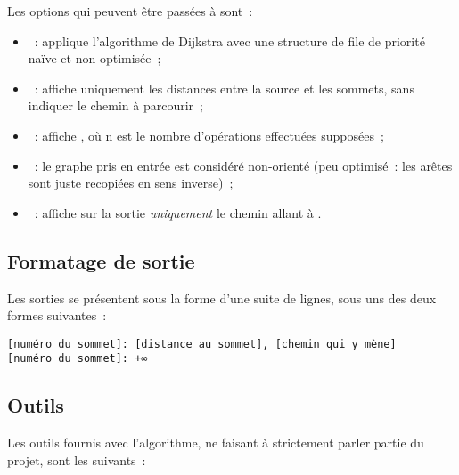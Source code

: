 \documentclass[12p0t,a4paper]{article}
\begin{document}
Les options qui peuvent être passées à  sont~:
\begin{itemize}
\item {}~: applique l'algorithme de Dijkstra avec une structure de file de priorité naïve et non optimisée~;
\item {}~: affiche uniquement les distances entre la source et les sommets, sans indiquer le chemin à parcourir~;
\item {}~: affiche , où n est le nombre d'opérations effectuées supposées~;
\item {}~: le graphe pris en entrée est considéré non-orienté (peu optimisé~: les arêtes sont juste recopiées en sens inverse)~;
\item {}~: affiche sur la sortie \emph{uniquement} le chemin allant à .
\end{itemize}

\subsection{Formatage de sortie}

Les sorties se présentent sous la forme d'une suite de lignes, sous uns des deux formes suivantes~:
\begin{lstlisting}
[numéro du sommet]: [distance au sommet], [chemin qui y mène]
[numéro du sommet]: +∞
\end{lstlisting}

\subsection{Outils}

Les outils fournis avec l'algorithme, ne faisant à strictement parler partie du projet, sont les suivants~:
\end{document}
